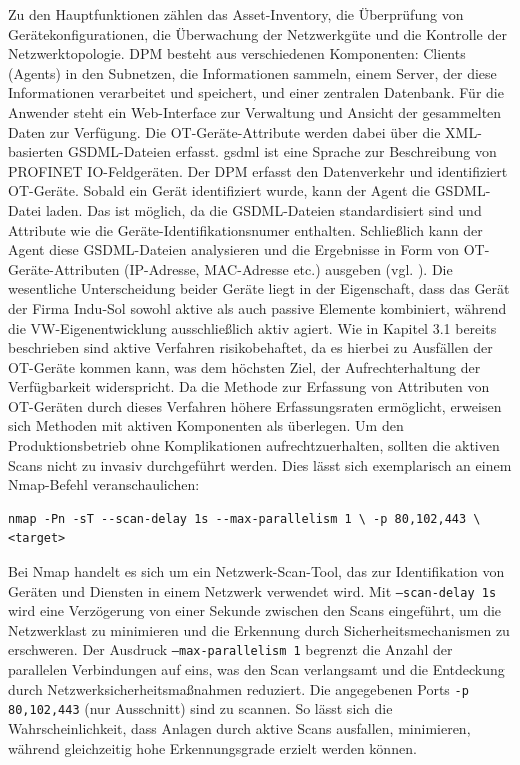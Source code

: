 Zu den Hauptfunktionen zählen das Asset-Inventory, die Überprüfung von Gerätekonfigurationen, die Überwachung der Netzwerkgüte und die Kontrolle der Netzwerktopologie. DPM besteht aus verschiedenen Komponenten: Clients (Agents) in den Subnetzen, die Informationen sammeln, einem Server, der diese Informationen verarbeitet und speichert, und einer zentralen Datenbank. Für die Anwender steht ein Web-Interface zur Verwaltung und Ansicht der gesammelten Daten zur Verfügung. Die OT-Geräte-Attribute werden dabei über die XML-basierten GSDML-Dateien erfasst.  \ac{gsdml} ist eine Sprache zur Beschreibung von PROFINET IO-Feldgeräten. Der DPM erfasst den Datenverkehr und identifiziert OT-Geräte. Sobald ein Gerät identifiziert wurde, kann der Agent die GSDML-Datei laden. Das ist möglich, da die GSDML-Dateien standardisiert sind und Attribute wie die Geräte-Identifikationsnumer enthalten. Schließlich kann der Agent diese GSDML-Dateien analysieren und die Ergebnisse in Form von OT-Geräte-Attributen (IP-Adresse, MAC-Adresse etc.) ausgeben (vgl. \cite{SIEMENS}). Die wesentliche Unterscheidung beider Geräte liegt in der Eigenschaft, dass das Gerät der Firma Indu-Sol sowohl aktive als auch passive Elemente kombiniert, während die VW-Eigenentwicklung ausschließlich aktiv agiert. Wie in Kapitel 3.1 bereits beschrieben sind aktive Verfahren risikobehaftet, da es hierbei zu Ausfällen der OT-Geräte kommen kann, was dem höchsten Ziel, der Aufrechterhaltung der Verfügbarkeit widerspricht. Da die Methode zur Erfassung von Attributen von OT-Geräten durch dieses Verfahren höhere Erfassungsraten ermöglicht, erweisen sich Methoden mit aktiven Komponenten als überlegen. \clearpage \noindent Um den Produktionsbetrieb ohne Komplikationen aufrechtzuerhalten, sollten die aktiven Scans nicht zu invasiv durchgeführt werden. Dies lässt sich exemplarisch an einem Nmap-Befehl veranschaulichen: 

\bigskip
\begin{verbatim}
nmap -Pn -sT --scan-delay 1s --max-parallelism 1 \ -p 80,102,443 \
<target>
\end{verbatim}
\bigskip

\noindent Bei Nmap handelt es sich um ein Netzwerk-Scan-Tool, das zur Identifikation von Geräten und Diensten in einem Netzwerk verwendet wird. Mit \texttt{--scan-delay 1s} wird eine Verzögerung von einer Sekunde zwischen den Scans eingeführt, um die Netzwerklast zu minimieren und die Erkennung durch Sicherheitsmechanismen zu erschweren. Der Ausdruck \newline \texttt{--max-parallelism 1} begrenzt die Anzahl der parallelen Verbindungen auf eins, was den Scan verlangsamt und die Entdeckung durch Netzwerksicherheitsmaßnahmen reduziert. Die angegebenen Ports \texttt{-p 80,102,443} (nur Ausschnitt) sind zu scannen. So lässt sich die Wahrscheinlichkeit, dass Anlagen durch aktive Scans ausfallen, minimieren, während gleichzeitig hohe Erkennungsgrade erzielt werden können.



